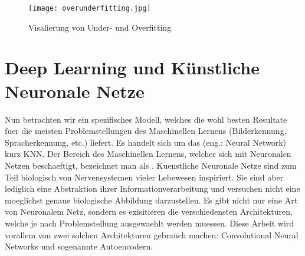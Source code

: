\begin{figure}[h!]
  \centering
  \texttt{[image: overunderfitting.jpg]}
  \caption{Visalierung von Under- und Overfitting}
\end{figure}

\cite{wiki:overfitting}


\chapter{Deep Learning und Künstliche Neuronale Netze}
Nun betrachten wir ein spezifisches Modell, welches die wohl besten Resultate
fuer die meisten Problemstellungen des Maschinellen Lernens (Bilderkennung,
Spracherkennung, etc.) liefert. Es handelt sich um das  (eng.: Neural Network) kurz KNN.
Der Bereich des Maschinellen Lernens, welcher sich mit Neuronalen Netzen
beschaeftigt, bezeichnet man als .
\para{}
Kuenstliche Neuronale Netze sind zum Teil biologisch von Nervensystemen vieler
Lebewesen inspiriert.
Sie sind aber lediglich eine Abstraktion ihrer Informationverarbeitung und versuchen nicht eine moeglichst genaue biologische Abbildung darzustellen.
Es gibt nicht nur eine Art von Neuronalem Netz, sondern es exisitieren die
verschiedensten Architekturen, welche je nach Problemstellung ausgewaehlt werden
muessen. Diese Arbeit wird vorallem von zwei solchen Architekturen gebrauch machen:
Convolutional Neural Networks und sogenannte Autoencodern.

\para{}
\cite{wiki:kuenstliches_neuronales_netz}

